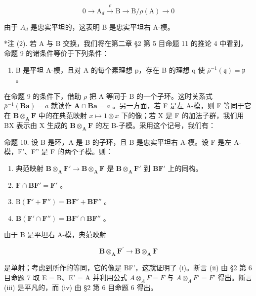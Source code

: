 \[
0 \longrightarrow \mathrm{A} _ {d} \stackrel {\rho} {\longrightarrow} \mathrm{B} \longrightarrow \mathrm{B} / \rho (\mathrm{A}) \longrightarrow 0
\]

由于 \(A_{d}\) 是忠实平坦的，这表明 B 是忠实平坦右 A-模。

*注 (2). 若 A 与 B 交换，我们将在第二章 §2 第 5 目命题 11 的推论 4 中看到，命题 9 的诸条件等价于下列条件：

\begin{enumerate}
\def\labelenumi{(\alph{enumi})}
\setcounter{enumi}{5}
\tightlist
\item
  B 是平坦 A-模，且对 A 的每个素理想 p，存在 B 的理想 q 使 \(\overline{\rho}^{-1}(\mathfrak{q}) = \mathfrak{p}\) 。
\end{enumerate}

在命题 9 的条件下，借助 \(\rho\) 把 A 等同于 B 的一个子环。这时关系式 \(\bar{\rho}^{-1}(\mathbf{Ba}) = a\) 就读作 \(\mathbf{A} \cap \mathbf{Ba} = a\) 。另一方面，若 F 是左 A-模，则 F 等同于它在 \(\mathbf{B} \otimes_{\mathbf{A}} \mathbf{F}\) 中的在典范映射 \(x \mapsto 1 \otimes x\) 下的像；若 X 是 F 的加法子群，我们用 BX 表示由 X 生成的 \(\mathbf{B} \otimes_{\mathbf{A}} \mathbf{F}\) 的左 B-子模。采用这个记号，我们有：

命题 10. 设 B 是环，A 是 B 的子环，且 B 是忠实平坦右 A-模。设 F 是左 A-模，F'、F'' 是 F 的两个子模。则：

\begin{enumerate}
\def\labelenumi{(\roman{enumi})}
\item
  典范映射 \(\mathbf{B} \otimes_{\mathbf{A}} \mathbf{F}' \to \mathbf{B} \otimes_{\mathbf{A}} \mathbf{F}\) 是 \(\mathbf{B} \otimes_{\mathbf{A}} \mathbf{F}'\) 到 \(\mathbf{BF}'\) 上的同构。
\item
  \(\mathbf{F} \cap \mathbf{BF}' = \mathbf{F}'\) 。
\item
  \(\mathrm{B}(\mathbf{F}' + \mathbf{F}'') = \mathbf{BF}' + \mathbf{BF}''\) 。
\item
  \(\mathbf{B}(\mathbf{F}'\cap \mathbf{F}'')=\mathbf{B}\mathbf{F}'\cap \mathbf{B}\mathbf{F}''\) 。
\end{enumerate}

由于 B 是平坦右 A-模，典范映射

\[
\mathbf {B} \otimes_ {\mathbf {A}} \mathbf {F} ^ {\prime} \rightarrow \mathbf {B} \otimes_ {\mathbf {A}} \mathbf {F}
\]

是单射；考虑到所作的等同，它的像是 BF'，这就证明了 (i)。断言 (ii) 由 §2 第 6 目命题 7 取 E = B、E' = A 并利用公式 \(A \otimes_{A} F = F\) 与 \(A \otimes_{A} F' = F'\) 得出。断言 (iii) 是平凡的，而 (iv) 由 §2 第 6 目命题 6 得出。

